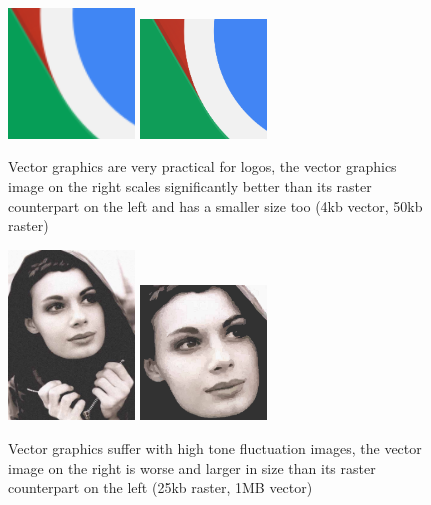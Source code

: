 \documentclass[12pt]{article}
\begin{document}
    \begin{figure}[h]
        \centering
        \includegraphics[width=0.3\textwidth]{ChromeRaster.png}
        \includegraphics[width=0.3\textwidth]{ChromeVector.png}
        \caption[Chrome]{Vector graphics are very practical for logos, the vector graphics image on the right scales
        significantly better than its raster counterpart on the left and has a smaller size too (4kb vector, 50kb
        raster)}
        \label{fig:chrome}
    \end{figure}
    \begin{figure}[h]
        \centering
        \includegraphics[width=0.3\textwidth]{WomanRaster.jpg}
        \includegraphics[width=0.3\textwidth]{WomanVector.png}
        \caption[Woman]{Vector graphics suffer with high tone fluctuation images, the vector image on the right is
        worse and larger in size than its raster counterpart on the left (25kb raster, 1MB vector)}
        \label{fig:woman}
    \end{figure}
\end{document}
